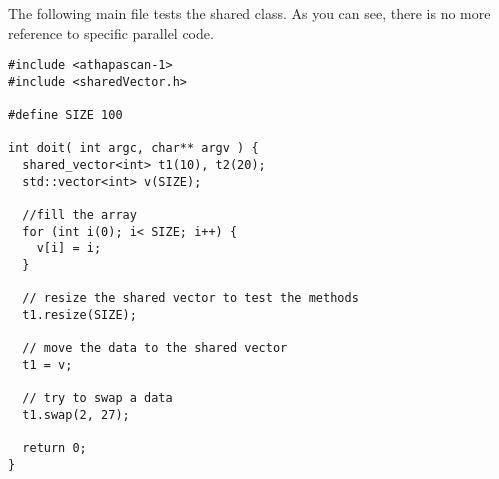 The following main file tests the shared class. As you can see,
there is no more reference to specific parallel code.
\begin{boxit}
\begin{verbatim}
#include <athapascan-1>
#include <sharedVector.h>

#define SIZE 100

int doit( int argc, char** argv ) {
  shared_vector<int> t1(10), t2(20);
  std::vector<int> v(SIZE);

  //fill the array
  for (int i(0); i< SIZE; i++) {
    v[i] = i;
  }

  // resize the shared vector to test the methods
  t1.resize(SIZE);

  // move the data to the shared vector
  t1 = v;

  // try to swap a data
  t1.swap(2, 27);

  return 0;
}
\end{verbatim}
\end{boxit}

